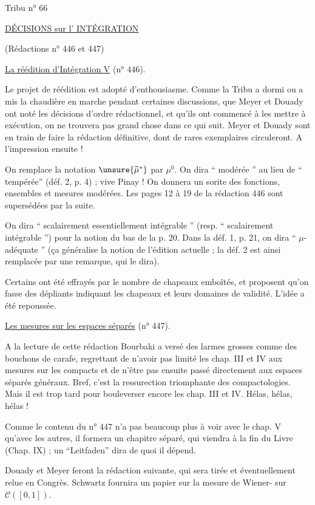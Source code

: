 \begin{flushright}Tribu n° 66\end{flushright}
\begin{center}
\uline{DÉCISIONS sur l' INTÉGRATION}

(Rédactions n° 446 et 447)

\unsure{-:-:-:-}
\end{center}

\uline{La réédition d'Intégration V} (n° 446).

Le projet de réédition est adopté d'enthousiasme. Comme la Tribu a dormi ou a mis la chaudière en marche pendant certaines discussions, que Meyer et Douady ont noté les décisions d'ordre rédactionnel, et qu'ils ont commencé à les mettre à exécution, on ne trouvera pas grand chose dans ce qui suit. Meyer et Douady sont en train de faire la rédaction définitive, dont de rares exemplaires circuleront. A l'impression ensuite !

On remplace la notation $\unsure{\widetilde\mu^*}$ par $\mu^0$. On dira `` modérée '' au lieu de `` tempérée'' (déf. 2, p. 4) ; vive Pinay ! On donnera un sorite des fonctions, ensembles et mesures modérées. Les pages 12 à 19 de la rédaction 446 sont supersédées par la suite.

On dira `` scalairement essentiellement intégrable '' (resp. `` scalairement intégrable '') pour la notion du bas de la p. 20. Dans la déf. 1, p. 21, on dira `` $\mu$-adéquate '' (ça généralise la notion de l'édition actuelle ; la déf. 2 est ainsi remplacée par une remarque, qui le dira).

Certains ont été effrayés par le nombre de chapeaux emboîtés, et proposent qu'on fasse des dépliants indiquant les chapeaux et leurs domaines de validité. L'idée a été repoussée.

\uline{Les mesures sur les espaces séparés} (n° 447).

A la lecture de cette rédaction Bourbaki a versé des larmes grosses comme des bouchons de carafe, regrettant de n'avoir pas limité les chap. III et IV aux mesures sur les compacts et de n'être pas ensuite passé directement aux espaces séparés généraux. Bref, c'est la ressurection triomphante des compactologies. Mais il est trop tard pour bouleverser encore les chap. III et IV. Hélas, hélas, hélas !

Comme le contenu du n° 447 n'a pas beaucoup plus à voir avec le chap. V qu'avec les autres, il formera un chapitre séparé, qui viendra à la fin du Livre (Chap. IX) ; un ``Leitfaden'' dira de quoi il dépend.

Douady et Meyer feront la rédaction suivante, qui sera tirée et éventuellement relue en Congrès. Schwartz fournira un papier sur la mesure de Wiener- sur $\mathcal C([0,1])$.
